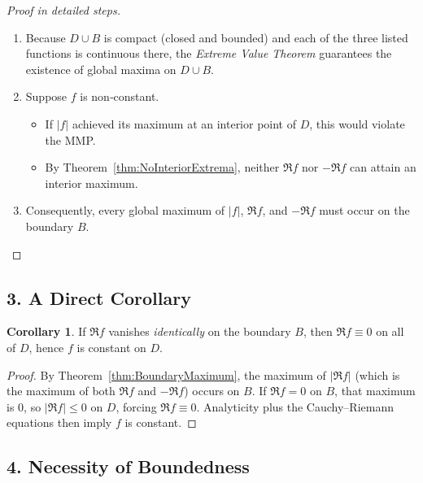 \documentclass[12pt]{article}
\theoremstyle{definition} %
\newtheorem{corollary}{Corollary}
\theoremstyle{plain} %
\begin{document}
\begin{proof}[Proof in detailed steps]
\begin{enumerate}
  \item Because $D\cup B$ is compact (closed and bounded) and each of the three listed
        functions is continuous there, the \emph{Extreme Value Theorem} guarantees
        the existence of global maxima on $D\cup B$.
  \item Suppose $f$ is non‑constant.  
        \begin{itemize}
            \item If $|f|$ achieved its maximum at an interior point of $D$, this would violate the MMP.
            \item By Theorem~\ref{thm:NoInteriorExtrema}, neither $\Re f$ nor $-\Re f$ can
                  attain an interior maximum.
        \end{itemize}
  \item Consequently, every global maximum of $|f|$, $\Re f$, and $-\Re f$
        must occur on the boundary $B$.
\end{enumerate}
\end{proof}

\subsection*{3.  A Direct Corollary}

\begin{corollary}
If $\Re f$ vanishes \emph{identically} on the boundary $B$, then $\Re f\equiv 0$ on all of $D$, hence $f$ is constant on $D$.
\end{corollary}

\begin{proof}
By Theorem~\ref{thm:BoundaryMaximum}, the maximum of $|\Re f|$ (which is the maximum of both $\Re f$ and $-\Re f$) occurs on $B$.  
If $\Re f=0$ on $B$, that maximum is $0$, so $|\Re f|\le 0$ on $D$, forcing $\Re f\equiv 0$.  
Analyticity plus the Cauchy–Riemann equations then imply $f$ is constant.
\end{proof}

\subsection*{4.  Necessity of Boundedness}
\end{document}
